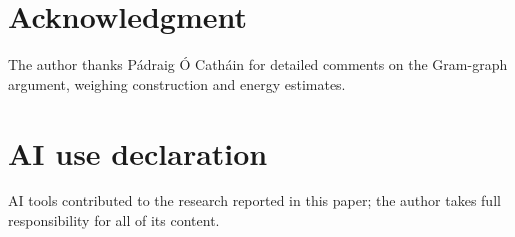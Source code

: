 \section*{Acknowledgment}
The author thanks P\'adraig \'O Cath\'ain for detailed comments on the Gram-graph argument, weighing construction and energy estimates.
\section*{AI use declaration}
AI tools contributed to the research reported in this paper; the author takes full responsibility for all of its content.
